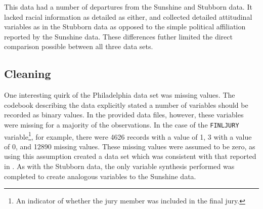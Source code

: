 This data had a number of departures from the Sunshine and Stubborn data. It lacked racial information as detailed as either, and
collected detailed attitudinal variables as in the Stubborn data as opposed to the simple political affiliation reported by the
Sunshine data. These differences futher limited the direct comparison
possible between all three data sets.

\subsection{Cleaning}

One interesting quirk of the Philadelphia data set was missing values. The codebook describing the data explicitly stated a
number of variables should be recorded as binary values. In the provided data files, however, these variables were missing for a
majority of the observations. In the case of the \texttt{FINLJURY}
variable\footnote{An indicator of whether the jury member was
included in the final jury.}, for example, there were 4626 records with a value of 1, 3 with a value of 0, and 12890 missing values. These
missing values were assumed to be zero, as using this assumption created a data set which was consistent with that reported in
\cite{PerempChalMurder}. As with the Stubborn data, the only variable synthesis performed was completed to create analogous
variables to the Sunshine data.